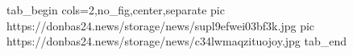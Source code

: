  
 
 
 
 

\ifcmt
  tab_begin cols=2,no_fig,center,separate
     pic https://donbas24.news/storage/news/supl9efwei03bf3k.jpg
     pic https://donbas24.news/storage/news/c34lwmaqzituojoy.jpg
  tab_end
\fi
